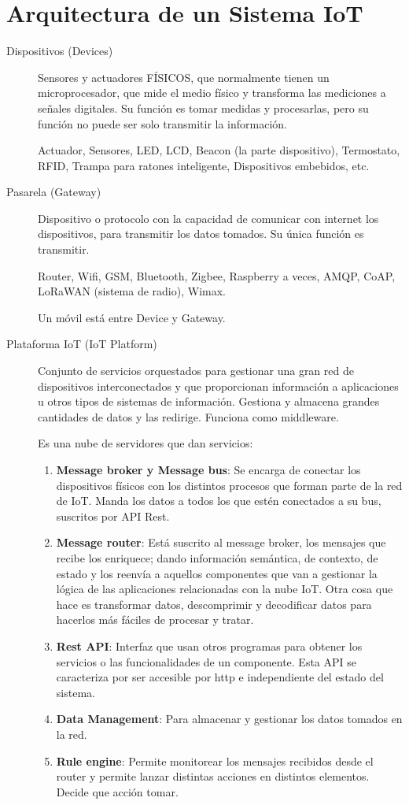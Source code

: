 \documentclass[12pt]{report} %
\begin{document}
\section{Arquitectura de un Sistema IoT}
\begin{description}
	\item[Dispositivos (Devices)] Sensores y actuadores FÍSICOS, que
	normalmente tienen un microprocesador, que mide el medio físico y
	transforma las mediciones a señales digitales. Su función es tomar
	medidas y procesarlas, pero su función no puede ser solo transmitir la
	información.
	
	Actuador, Sensores, LED, LCD, Beacon (la parte dispositivo), Termostato,
	RFID, Trampa para ratones inteligente, Dispositivos embebidos, etc.
	\item[Pasarela (Gateway)] Dispositivo o protocolo con la capacidad de
	comunicar con internet los dispositivos, para transmitir los datos
	tomados. Su única función es transmitir.
	
	Router, Wifi, GSM, Bluetooth, Zigbee, Raspberry a veces, AMQP, CoAP,
	LoRaWAN (sistema de radio), Wimax.
	
	Un móvil está entre Device y Gateway.
	\item[Plataforma IoT (IoT Platform)] Conjunto de servicios
	orquestados para gestionar una gran red de dispositivos interconectados
	y que proporcionan información a aplicaciones u otros tipos de sistemas
	de información. Gestiona y almacena grandes cantidades de datos y las
	redirige. Funciona como middleware.
	
	Es una nube de servidores que dan servicios:
	
	\begin{enumerate}
		\item \textbf{Message broker y Message bus}: Se encarga de conectar los
		dispositivos físicos con los distintos procesos que forman parte de la
		red de IoT. Manda los datos a todos los que estén conectados a su bus,
		suscritos por API Rest.
		\item
		\textbf{Message router}: Está suscrito al message broker, los mensajes
		que recibe los enriquece; dando información semántica, de contexto, de
		estado y los reenvía a aquellos componentes que van a gestionar la
		lógica de las aplicaciones relacionadas con la nube IoT. Otra cosa que
		hace es transformar datos, descomprimir y decodificar datos para
		hacerlos más fáciles de procesar y tratar.
		\item
		\textbf{Rest API}: Interfaz que usan otros programas para obtener los
		servicios o las funcionalidades de un componente. Esta API se
		caracteriza por ser accesible por http e independiente del estado del
		sistema.
		\item
		\textbf{Data Management}: Para almacenar y gestionar los datos tomados
		en la red.
		\item
		\textbf{Rule engine}: Permite monitorear los mensajes recibidos desde
		el router y permite lanzar distintas acciones en distintos elementos.
		Decide que acción tomar.
		

\end{enumerate}
\end{description}
\end{document}
